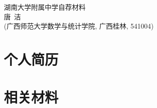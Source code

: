 \documentclass[UFT8]{ctexart}%
\begin{document}
\thispagestyle{empty} %
\vspace*{3cm}
\begin{center}
{{\LARGE\heiti 湖南大学附属中学自荐材料}\\[0.6cm]
{\normalsize 唐\ 洁}\\[0.1cm]
{\small(广西师范大学数学与统计学院, 广西桂林, 541004)}}
\end{center}

\clearpage%
\tableofcontents%
\thispagestyle{empty} %

\clearpage%
\setcounter{page}{1}%

%
%
%
%
%
%
%

\section{个人简历}


\section{相关材料}
\end{document}
